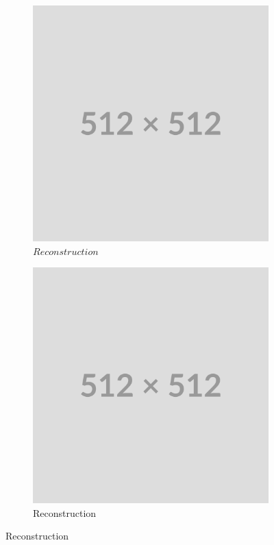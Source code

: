 \begin{figure}
    \centering
    \begin{subfigure}[b]{0.4\textwidth}
        \centering
        \includegraphics[width=\textwidth]{img/placeholder512.png}
        \caption{$Reconstruction$}
        \label{fig:rec-freqs-1hl}
    \end{subfigure}
    \hfill
    \begin{subfigure}[b]{0.4\textwidth}
        \centering
        \includegraphics[width=\textwidth]{img/placeholder512.png}
        \caption{Reconstruction}
        \label{fig:fft-freqs-1hl}
    \end{subfigure}
    

\end{figure}
